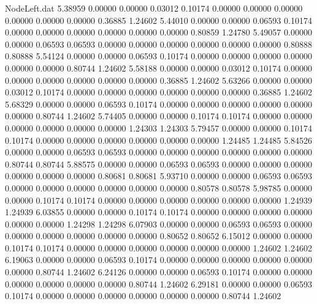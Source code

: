 \begin{filecontents}{NodeLeft.dat}
   5.38959    0.00000    0.00000     0.03012    0.10174    0.00000    0.00000    0.00000    0.00000    0.00000    0.00000    0.36885    1.24602
   5.44010    0.00000    0.00000     0.06593    0.10174    0.00000    0.00000    0.00000    0.00000    0.00000    0.00000    0.80859    1.24780
   5.49057    0.00000    0.00000     0.06593    0.06593    0.00000    0.00000    0.00000    0.00000    0.00000    0.00000    0.80888    0.80888
   5.54124    0.00000    0.00000     0.06593    0.10174    0.00000    0.00000    0.00000    0.00000    0.00000    0.00000    0.80744    1.24602
   5.58188    0.00000    0.00000     0.03012    0.10174    0.00000    0.00000    0.00000    0.00000    0.00000    0.00000    0.36885    1.24602
   5.63266    0.00000    0.00000     0.03012    0.10174    0.00000    0.00000    0.00000    0.00000    0.00000    0.00000    0.36885    1.24602
   5.68329    0.00000    0.00000     0.06593    0.10174    0.00000    0.00000    0.00000    0.00000    0.00000    0.00000    0.80744    1.24602
   5.74405    0.00000    0.00000     0.10174    0.10174    0.00000    0.00000    0.00000    0.00000    0.00000    0.00000    1.24303    1.24303
   5.79457    0.00000    0.00000     0.10174    0.10174    0.00000    0.00000    0.00000    0.00000    0.00000    0.00000    1.24485    1.24485
   5.84526    0.00000    0.00000     0.06593    0.06593    0.00000    0.00000    0.00000    0.00000    0.00000    0.00000    0.80744    0.80744
   5.88575    0.00000    0.00000     0.06593    0.06593    0.00000    0.00000    0.00000    0.00000    0.00000    0.00000    0.80681    0.80681
   5.93710    0.00000    0.00000     0.06593    0.06593    0.00000    0.00000    0.00000    0.00000    0.00000    0.00000    0.80578    0.80578
   5.98785    0.00000    0.00000     0.10174    0.10174    0.00000    0.00000    0.00000    0.00000    0.00000    0.00000    1.24939    1.24939
   6.03855    0.00000    0.00000     0.10174    0.10174    0.00000    0.00000    0.00000    0.00000    0.00000    0.00000    1.24298    1.24298
   6.07903    0.00000    0.00000     0.06593    0.06593    0.00000    0.00000    0.00000    0.00000    0.00000    0.00000    0.80652    0.80652
   6.15012    0.00000    0.00000     0.10174    0.10174    0.00000    0.00000    0.00000    0.00000    0.00000    0.00000    1.24602    1.24602
   6.19063    0.00000    0.00000     0.06593    0.10174    0.00000    0.00000    0.00000    0.00000    0.00000    0.00000    0.80744    1.24602
   6.24126    0.00000    0.00000     0.06593    0.10174    0.00000    0.00000    0.00000    0.00000    0.00000    0.00000    0.80744    1.24602
   6.29181    0.00000    0.00000     0.06593    0.10174    0.00000    0.00000    0.00000    0.00000    0.00000    0.00000    0.80744    1.24602

\end{filecontents}
